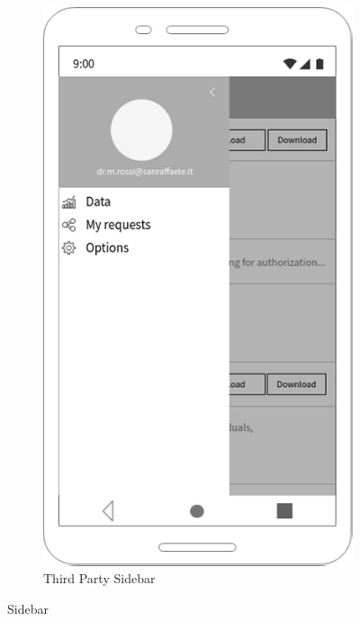 \begin{figure}[h!]
\begin{subfigure}[b]{0.25\linewidth}
    \includegraphics[width=\linewidth]{img/mockup/tp_sidebar.jpg}

    \caption{Third Party Sidebar}

  \end{subfigure}

\caption{Sidebar}

 \end{figure}

\clearpage

